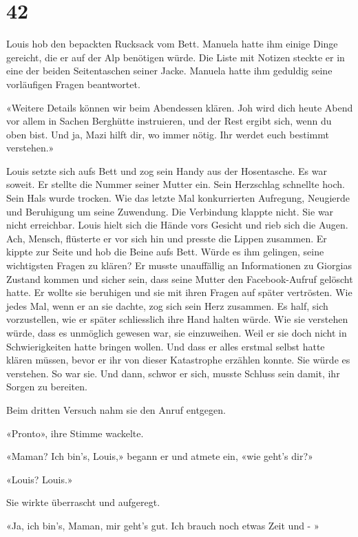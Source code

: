 \chapter{42}



Louis hob den bepackten Rucksack vom Bett. Manuela hatte ihm einige
Dinge gereicht, die er auf der Alp benötigen würde. Die Liste mit
Notizen steckte er in eine der beiden Seitentaschen seiner Jacke. Manuela hatte ihm
geduldig seine vorläufigen Fragen beantwortet.

«Weitere Details können wir beim Abendessen klären. Joh wird dich heute
Abend vor allem in Sachen Berghütte instruieren, und der Rest ergibt
sich, wenn du oben bist. Und ja, Mazi hilft dir, wo immer nötig. Ihr
werdet euch bestimmt verstehen.»

Louis setzte sich aufs Bett und zog sein Handy aus der Hosentasche. Es
war soweit. Er stellte die Nummer seiner Mutter ein. Sein Herzschlag schnellte
hoch. Sein Hals wurde trocken. Wie das letzte Mal konkurrierten
Aufregung, Neugierde und Beruhigung um seine Zuwendung.
Die Verbindung klappte nicht. Sie war nicht erreichbar. Louis hielt sich die Hände vors Gesicht und rieb sich die 
Augen. Ach, Mensch, flüsterte er vor sich hin und presste die Lippen
zusammen. Er kippte zur Seite und hob die Beine aufs Bett. Würde es ihm gelingen, 
seine wichtigsten Fragen zu klären? Er musste unauffällig an Informationen zu Giorgias Zustand 
kommen und sicher sein, dass seine Mutter den Facebook-Aufruf gelöscht hatte.
Er wollte sie beruhigen und sie mit ihren Fragen auf später vertrösten. Wie
jedes Mal, wenn er an sie dachte, zog sich sein Herz 
zusammen. Es half, sich vorzustellen, wie er später schliesslich ihre Hand halten würde. Wie sie verstehen würde,
dass es unmöglich gewesen war, sie einzuweihen. Weil er sie doch nicht
in Schwierigkeiten hatte bringen wollen. Und dass er alles erstmal selbst
hatte klären müssen, bevor er ihr von dieser Katastrophe erzählen
konnte. Sie würde es verstehen. So war sie. Und dann, schwor er sich, musste
Schluss sein damit, ihr Sorgen zu bereiten.

Beim dritten Versuch nahm sie den Anruf entgegen.

«Pronto», ihre Stimme wackelte.

«Maman? Ich bin’s, Louis,» begann er und atmete ein, «wie geht’s dir?»

«Louis? Louis.»

Sie wirkte überrascht und aufgeregt.

«Ja, ich bin’s, Maman, mir geht’s gut. Ich brauch noch etwas Zeit und - »

